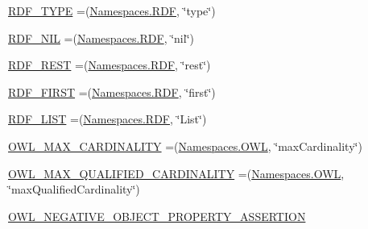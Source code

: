 \begin{DoxyCompactItemize}
\item 
\hyperlink{enumorg_1_1semanticweb_1_1owlapi_1_1vocab_1_1_o_w_l_r_d_f_vocabulary_a80cbe8cb6ef5b88f08341280dafb0921}{R\-D\-F\-\_\-\-T\-Y\-P\-E} =(\hyperlink{enumorg_1_1semanticweb_1_1owlapi_1_1vocab_1_1_namespaces_a0d1c7991e82e2b5c495bb87f1123ce30}{Namespaces.\-R\-D\-F}, \char`\"{}type\char`\"{})
\item 
\hyperlink{enumorg_1_1semanticweb_1_1owlapi_1_1vocab_1_1_o_w_l_r_d_f_vocabulary_adce895a458ec27f5acad1ee96ceef82c}{R\-D\-F\-\_\-\-N\-I\-L} =(\hyperlink{enumorg_1_1semanticweb_1_1owlapi_1_1vocab_1_1_namespaces_a0d1c7991e82e2b5c495bb87f1123ce30}{Namespaces.\-R\-D\-F}, \char`\"{}nil\char`\"{})
\item 
\hyperlink{enumorg_1_1semanticweb_1_1owlapi_1_1vocab_1_1_o_w_l_r_d_f_vocabulary_a2679f9e990891d82d82166a3bc70aeb9}{R\-D\-F\-\_\-\-R\-E\-S\-T} =(\hyperlink{enumorg_1_1semanticweb_1_1owlapi_1_1vocab_1_1_namespaces_a0d1c7991e82e2b5c495bb87f1123ce30}{Namespaces.\-R\-D\-F}, \char`\"{}rest\char`\"{})
\item 
\hyperlink{enumorg_1_1semanticweb_1_1owlapi_1_1vocab_1_1_o_w_l_r_d_f_vocabulary_a5540f558a34d2edc19722b9aa94298a9}{R\-D\-F\-\_\-\-F\-I\-R\-S\-T} =(\hyperlink{enumorg_1_1semanticweb_1_1owlapi_1_1vocab_1_1_namespaces_a0d1c7991e82e2b5c495bb87f1123ce30}{Namespaces.\-R\-D\-F}, \char`\"{}first\char`\"{})
\item 
\hyperlink{enumorg_1_1semanticweb_1_1owlapi_1_1vocab_1_1_o_w_l_r_d_f_vocabulary_a6db0861017521f1d7f443d10cff23abd}{R\-D\-F\-\_\-\-L\-I\-S\-T} =(\hyperlink{enumorg_1_1semanticweb_1_1owlapi_1_1vocab_1_1_namespaces_a0d1c7991e82e2b5c495bb87f1123ce30}{Namespaces.\-R\-D\-F}, \char`\"{}List\char`\"{})
\item 
\hyperlink{enumorg_1_1semanticweb_1_1owlapi_1_1vocab_1_1_o_w_l_r_d_f_vocabulary_a11a97ff52534124dafbe1fcb60af8e4d}{O\-W\-L\-\_\-\-M\-A\-X\-\_\-\-C\-A\-R\-D\-I\-N\-A\-L\-I\-T\-Y} =(\hyperlink{enumorg_1_1semanticweb_1_1owlapi_1_1vocab_1_1_namespaces_a2fcb537074d9307ef1356ffb6a5bd6f4}{Namespaces.\-O\-W\-L}, \char`\"{}max\-Cardinality\char`\"{})
\item 
\hyperlink{enumorg_1_1semanticweb_1_1owlapi_1_1vocab_1_1_o_w_l_r_d_f_vocabulary_a575eb448f7b5922549c1d287c138e235}{O\-W\-L\-\_\-\-M\-A\-X\-\_\-\-Q\-U\-A\-L\-I\-F\-I\-E\-D\-\_\-\-C\-A\-R\-D\-I\-N\-A\-L\-I\-T\-Y} =(\hyperlink{enumorg_1_1semanticweb_1_1owlapi_1_1vocab_1_1_namespaces_a2fcb537074d9307ef1356ffb6a5bd6f4}{Namespaces.\-O\-W\-L}, \char`\"{}max\-Qualified\-Cardinality\char`\"{})
\item 
\hyperlink{enumorg_1_1semanticweb_1_1owlapi_1_1vocab_1_1_o_w_l_r_d_f_vocabulary_ac76a6ed7effd7c406e6a8e4f7c319582}{O\-W\-L\-\_\-\-N\-E\-G\-A\-T\-I\-V\-E\-\_\-\-O\-B\-J\-E\-C\-T\-\_\-\-P\-R\-O\-P\-E\-R\-T\-Y\-\_\-\-A\-S\-S\-E\-R\-T\-I\-O\-N}

\end{DoxyCompactItemize}
